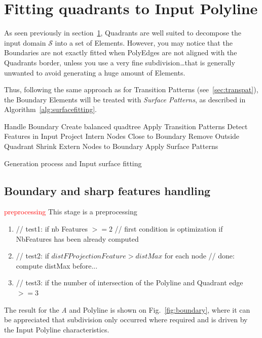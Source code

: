 \documentclass[10pt]{article}
\begin{document}
\section{Fitting quadrants to Input Polyline}
\label{sec:method}

As seen previously in section~\ref{sec:method}, Quadrants are well suited to decompose the input  domain $\mathcal{S}$ into a set of Elements. However, you may notice that the Boundaries are not exactly fitted when PolyEdges are not aligned with the Quadrants border, unless you use a very fine subdivision\ldots that is generally unwanted to avoid generating a huge amount of Elements.

Thus, following the same approach as for Transition Patterns (see~\ref{sec:transpat}), the Boundary Elements will be treated with \textit{Surface Patterns}, as described in Algorithm~\ref{alg:surfacefitting}.\\

\begin{algorithm}[H]
%
\setcounter{AlgoLine}{-1}
\SetAlgoLined
{}
\nl   Handle Boundary\; \label{alg:bound2}
\nl {}
 \nl Create balanced quadtree\; \label{alg:goto2}
 \nl Apply Transition Patterns\;
 \nl Detect Features in Input\;
 \nl  Project Intern Nodes Close to Boundary\; \label{alg:closeto2}
  \nl Remove Outside Quadrant\; \label{alg:remsur2}
  \nl Shrink Extern Nodes to Boundary\; \label{alg:shrink2}
 \nl Apply Surface Patterns\; \label{alg:surfpat2}
 \caption{Generation process and Input surface fitting}
 \label{alg:surfacefitting}
\end{algorithm}

\subsection{Boundary and sharp features handling}
\label{sec:boundary}

\textcolor{red}{preprocessing}
This stage is a preprocessing 

\begin{enumerate}
\item        // test1: if nb Features $>= 2$
        // first condition is optimization if NbFeatures has been already computed
\item        // test2: if $distFProjectionFeature > distMax$ for each node
        // done: compute distMax before...
\item        // test3: if the number of intersection of the Polyline and Quadrant edge $>= 3$
\end{enumerate}
The result for the \textit{A} and  Polyline is shown on Fig.~\ref{fig:boundary}, where it can be appreciated that subdivision only occurred where required and is driven by the Input Polyline characteristics.
\end{document}

